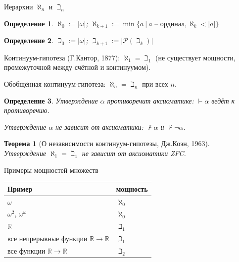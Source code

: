 \documentclass[aspectratio=169]{beamer}
\newtheorem{thm}{Теорема}[section]
\newtheorem{dfn}{Определение}[section]
\newcommand{\divisible}%
{\mathrel{\lower.2ex%
\vbox{\baselineskip=0.7ex\lineskiplimit=0pt%
\kern6pt \hbox{.}\hbox{.}\hbox{.}}%
}}
\begin{document}
\begin{frame}{Иерархии $\aleph_n$ и $\beth_n$}
\begin{dfn}$\aleph_0 := |\omega|$; $\aleph_{k+1} := \min\{ a\ |\ a\text{ -- ординал},\aleph_k < |a|\}$\end{dfn}
\begin{dfn}$\beth_0 := |\omega|$; $\beth_{k+1} := |\mathcal{P}(\beth_k)|$\end{dfn}

Континуум-гипотеза (Г.Кантор, 1877): $\aleph_1 = \beth_1$ (не существует мощности, промежуточной 
между счётной и континуумом).

Обобщённая континуум-гипотеза: $\aleph_n = \beth_n$ при всех $n$.

\begin{dfn}Утверждение $\alpha$ противоречит аксиоматике: $\vdash\alpha$ ведёт к противоречию.

Утверждение $\alpha$ не зависит от аксиоматики: $\not\vdash\alpha$ и $\not\vdash\neg\alpha$.\end{dfn}\pause

\begin{thm}[О независимости континуум-гипотезы, Дж.Коэн, 1963] Утверждение $\aleph_1 = \beth_1$
не зависит от аксиоматики ZFC.\end{thm}
\end{frame}

\begin{frame}{Примеры мощностей множеств}
\begin{center}\begin{tabular}{l|l}Пример & мощность\\\hline
$\omega$ & $\aleph_0$\\
$\omega^2$, $\omega^\omega$ & $\aleph_0$\\
$\mathbb{R}$ & $\beth_1$\\
все непрерывные функции $\mathbb{R}\rightarrow\mathbb{R}$ & $\beth_1$\\
все функции $\mathbb{R}\rightarrow\mathbb{R}$ & $\beth_2$
\end{tabular}\end{center}

\end{frame}

\end{document}

